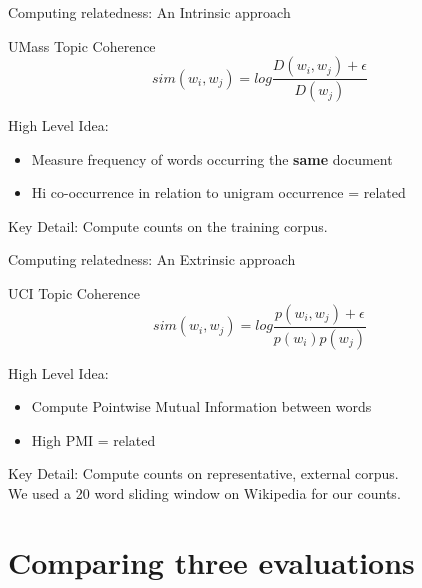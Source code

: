 \documentclass[compress]{beamer}
\begin{document}
\begin{frame}{Computing relatedness: An Intrinsic approach}
\begin{block}{UMass Topic Coherence}
\[
sim(w_i, w_j) = log \frac{ D(w_i, w_j) + \epsilon } { D(w_j) }
\]
\end{block}
High Level Idea:
\begin{itemize}
\item Measure frequency of words occurring the \textbf{same} document
\item Hi co-occurrence in relation to unigram occurrence = related
\end{itemize}

Key Detail: Compute counts on the training corpus.
\end{frame}

\begin{frame}{Computing relatedness: An Extrinsic approach}
\begin{block}{UCI Topic Coherence}
\[
sim(w_i, w_j) = log \frac{ p(w_i, w_j) + \epsilon } { p(w_i) p(w_j) }
\]
\end{block}

High Level Idea:
\begin{itemize}
\item Compute Pointwise Mutual Information between words
\item High PMI = related
\end{itemize}

Key Detail: Compute counts on representative, external corpus. \\
We used a 20 word sliding window on Wikipedia for our counts.
\end{frame}

\section{Comparing three evaluations}
\end{document}
